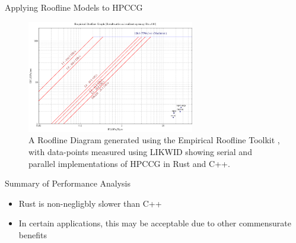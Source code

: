 \documentclass[10pt,aspectratio=169]{beamer}
\begin{document}







\begin{frame}{Applying Roofline Models to HPCCG}
    \begin{figure}[H]
        \includegraphics[width=0.65\textwidth]{images/Athena_ERT_generated_roofline.pdf}
        \caption{A Roofline Diagram generated using the Empirical Roofline Toolkit \cite{yangEmpiricalRooflineMethodology2018}, with data-points measured using LIKWID \cite{treibigLIKWIDLightweightPerformance2012} showing serial and parallel implementations of HPCCG in Rust and C++.}
        \label{fig:intelvtune}
    \end{figure}
\end{frame}

\begin{frame}{Summary of Performance Analysis}
    \begin{itemize}
        \item Rust is non-negligbly slower than C++
        \item In certain applications, this may be acceptable due to other commensurate benefits
    \end{itemize}
\end{frame}
\end{document}
